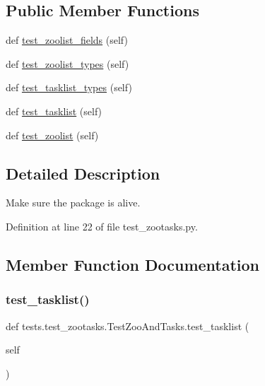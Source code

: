 \subsection*{Public Member Functions}
\begin{DoxyCompactItemize}
\item 
def \hyperlink{classtests_1_1test__zootasks_1_1TestZooAndTasks_a57e8f4db75b9eb31263d4e269c40068f}{test\+\_\+zoolist\+\_\+fields} (self)
\item 
def \hyperlink{classtests_1_1test__zootasks_1_1TestZooAndTasks_a8d7616fa41ed03322c86a565eedb4e8c}{test\+\_\+zoolist\+\_\+types} (self)
\item 
def \hyperlink{classtests_1_1test__zootasks_1_1TestZooAndTasks_ae25086584b24c10c24a9bda486b32c4a}{test\+\_\+tasklist\+\_\+types} (self)
\item 
def \hyperlink{classtests_1_1test__zootasks_1_1TestZooAndTasks_af33cbd4d8b989997428574cd787755ae}{test\+\_\+tasklist} (self)
\item 
def \hyperlink{classtests_1_1test__zootasks_1_1TestZooAndTasks_a1c1bb2568bc1871c11d14ac136a9e2b3}{test\+\_\+zoolist} (self)
\end{DoxyCompactItemize}


\subsection{Detailed Description}
\begin{DoxyVerb}Make sure the package is alive.
\end{DoxyVerb}
 

Definition at line 22 of file test\+\_\+zootasks.\+py.



\subsection{Member Function Documentation}
\mbox{\label{classtests_1_1test__zootasks_1_1TestZooAndTasks_af33cbd4d8b989997428574cd787755ae}} 
\subsubsection{\texorpdfstring{test\+\_\+tasklist()}{test\_tasklist()}}
{\footnotesize\ttfamily def tests.\+test\+\_\+zootasks.\+Test\+Zoo\+And\+Tasks.\+test\+\_\+tasklist (\begin{DoxyParamCaption}\item[{}]{self }\end{DoxyParamCaption})}

